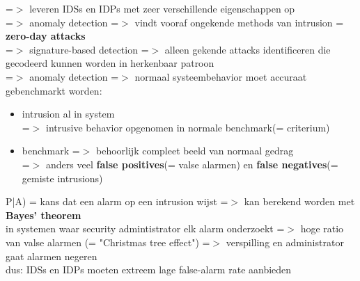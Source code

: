 \documentclass{report}
\begin{document}
=$>$ leveren IDSs en IDPs met zeer verschillende eigenschappen op 
\\=$>$ anomaly detection =$>$ vindt vooraf ongekende methods van intrusion = \textbf{zero-day attacks}
\\=$>$ signature-based detection =$>$ alleen gekende attacks identificeren die gecodeerd kunnen worden in herkenbaar patroon
\\=$>$ anomaly detection =$>$ normaal systeembehavior moet accuraat gebenchmarkt worden:
\begin{itemize}
\item intrusion al in system 
\\=$>$ intrusive behavior opgenomen in normale benchmark(= criterium)
\item benchmark =$>$ behoorlijk compleet beeld van normaal gedrag
\\=$>$ anders veel \textbf{false positives}(= valse alarmen) en \textbf{false negatives}(= gemiste intrusions)
\end{itemize}
P|A) = kans dat een alarm op een intrusion wijst =$>$ kan berekend worden met \textbf{Bayes' theorem}
\\ in systemen waar security admintistrator elk alarm onderzoekt =$>$ hoge ratio van valse alarmen (= "Christmas tree effect") =$>$ verspilling en administrator gaat alarmen negeren
\\dus: IDSs en IDPs moeten extreem lage false-alarm rate aanbieden
\end{document}
